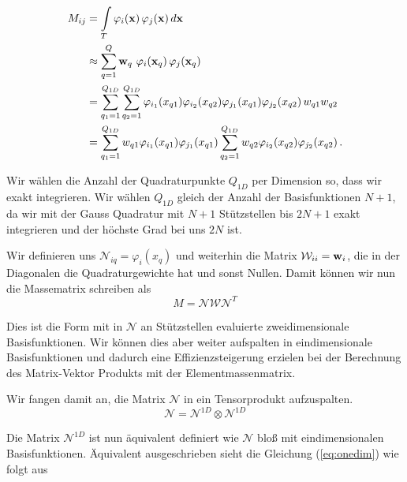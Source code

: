 \begin{equation} \label{eq:massapprox}
\begin{aligned}
M_{ij} &= \int\limits_{T} \varphi_i (\bold{x}) \, \varphi_j (\bold{x}) \, d\bold{x} \\
&\approx  \sum\limits_{q=1}^Q \bold{w}_q \, \, \varphi_i (\bold{x}_q) \, \varphi_j (\bold{x}_q) \\
&= \sum\limits_{q_1=1}^{Q_{1D}} \sum\limits_{q_2=1}^{Q_{1D}} \varphi_{i_1}(x_{q1}) \varphi_{i_2}(x_{q2}) \varphi_{j_1}(x_{q1}) \varphi_{j_2}(x_{q2}) \, w_{q1} w_{q2} \\ 
&= \sum\limits_{q_1=1}^{Q_{1D}} w_{q1} \varphi_{i_1}(x_{q1}) \varphi_{j_1}(x_{q1}) \sum\limits_{q_2=1}^{Q_{1D}} w_{q2} \varphi_{i_2}(x_{q2}) \varphi_{j_2}(x_{q2}) \, . 
\end{aligned}
\end{equation}

Wir wählen die Anzahl der Quadraturpunkte $Q_{1D}$ per Dimension so, dass wir exakt integrieren. Wir wählen $Q_{1D}$ gleich der Anzahl der Basisfunktionen $N+1$, da wir mit der Gauss Quadratur mit $N+1$ Stützstellen bis $2N+1$ exakt integrieren und der höchste Grad bei uns $2N$ ist.

Wir definieren uns $\mathcal{N}_{iq}=\varphi_i(x_q)$ und weiterhin die Matrix $\mathcal{W}_{ii}=\bold{w}_i$, die in der Diagonalen die Quadraturgewichte hat und sonst Nullen. Damit können wir nun die Massematrix schreiben als
\begin{equation}
M = \mathcal{N} \mathcal{W} \mathcal{N}^T
\end{equation}

Dies ist die Form mit in $\mathcal{N}$ an Stützstellen evaluierte zweidimensionale Basisfunktionen. Wir können dies aber weiter aufspalten in eindimensionale Basisfunktionen und dadurch eine Effizienzsteigerung erzielen bei der Berechnung des Matrix-Vektor Produkts mit der Elementmassenmatrix.

Wir fangen damit an, die Matrix $\mathcal{N}$ in ein Tensorprodukt aufzuspalten. 
\begin{equation} \label{eq:onedim}
\mathcal{N} = \mathcal{N}^{1D} \otimes \mathcal{N}^{1D}
\end{equation}

Die Matrix $\mathcal{N}^{1D}$ ist nun äquivalent definiert wie $\mathcal{N}$ bloß mit eindimensionalen Basisfunktionen. Äquivalent ausgeschrieben sieht die Gleichung (\ref{eq:onedim}) wie folgt aus

